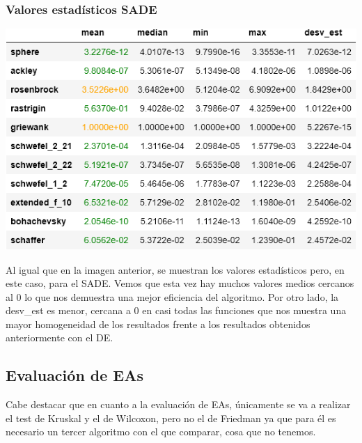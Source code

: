 \documentclass[11pt, a4paper, titlepage]{article}
\begin{document}
\subsubsection{Valores estadísticos SADE}
\vspace{5mm}
\begin{center}
\includegraphics[width=\textwidth]{tableSADE.png}
\end{center}
Al igual que en la imagen anterior, se muestran los valores estadísticos pero, en este caso, para el SADE. Vemos que esta vez hay muchos valores medios cercanos al 0 lo que nos demuestra una mejor eficiencia del algoritmo. Por otro lado, la desv\_est es menor, cercana a 0 en casi todas las funciones que nos muestra una mayor homogeneidad de los resultados frente a los resultados obtenidos anteriormente con el DE.

\newpage

\subsection{Evaluación de EAs}
Cabe destacar que en cuanto a la evaluación de EAs, únicamente se va a realizar el test de Kruskal y el de Wilcoxon, pero no el de Friedman ya que para él es necesario un tercer algoritmo con el que comparar, cosa que no tenemos.
\end{document}
